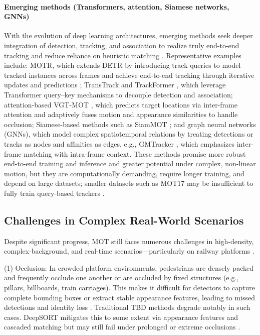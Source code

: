 \paragraph{Emerging methods (Transformers, attention, Siamese networks, GNNs)}
With the evolution of deep learning architectures, emerging methods seek deeper integration of detection, tracking, and association to realize truly end-to-end tracking and reduce reliance on heuristic matching \cite{108}. Representative examples include: MOTR, which extends DETR by introducing track queries to model tracked instances across frames and achieve end-to-end tracking through iterative updates and predictions \cite{131}; TransTrack \cite{97} and TrackFormer \cite{164}, which leverage Transformer query–key mechanisms to decouple detection and association; attention-based VGT-MOT \cite{85}, which predicts target locations via inter-frame attention and adaptively fuses motion and appearance similarities to handle occlusion; Siamese-based methods such as SiamMOT \cite{151}; and graph neural networks (GNNs), which model complex spatiotemporal relations by treating detections or tracks as nodes and affinities as edges, e.g., GMTracker \cite{209}, which emphasizes inter-frame matching with intra-frame context. These methods promise more robust end-to-end training and inference and greater potential under complex, non-linear motion, but they are computationally demanding, require longer training, and depend on large datasets; smaller datasets such as MOT17 may be insufficient to fully train query-based trackers \cite{155}.

\subsection{Challenges in Complex Real-World Scenarios}

Despite significant progress, MOT still faces numerous challenges in high-density, complex-background, and real-time scenarios—particularly on railway platforms \cite{59_wang_deep_2024}.

(1) Occlusion: In crowded platform environments, pedestrians are densely packed and frequently occlude one another or are occluded by fixed structures (e.g., pillars, billboards, train carriages). This makes it difficult for detectors to capture complete bounding boxes or extract stable appearance features, leading to missed detections and identity loss \cite{169}. Traditional TBD methods degrade notably in such cases. DeepSORT mitigates this to some extent via appearance features and cascaded matching but may still fail under prolonged or extreme occlusions \cite{134}.

